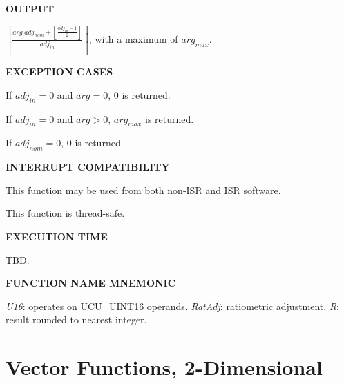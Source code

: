 \noindent\textbf{OUTPUT}
\begin{list}{}{\setlength{\leftmargin}{0.25in}\setlength{\topsep}{0.0in}}
\item       $\displaystyle{\left\lfloor \frac{arg\;adj_{nom} + \left\lfloor \displaystyle{\frac{adj_{in} - 1}{2}} \right\rfloor}{adj_{in}} \right\rfloor}$,
            with a maximum of $arg_{max}$.
\end{list}
\vspace{2.8ex}

\noindent\textbf{EXCEPTION CASES}
\begin{list}{}{\setlength{\leftmargin}{0.25in}\setlength{\topsep}{0.0in}}
\item If $adj_{in}=0$ and $arg=0$, 0 is returned.
\item If $adj_{in}=0$ and $arg>0$, $arg_{max}$ is returned.
\item If $adj_{nom}=0$, 0 is returned.
\end{list}
\vspace{2.8ex}

\noindent\textbf{INTERRUPT COMPATIBILITY}
\begin{list}{}{\setlength{\leftmargin}{0.25in}\setlength{\topsep}{0.0in}}
\item This function may be used from both non-ISR and ISR software.
\item This function is thread-safe.
\end{list}
\vspace{2.8ex}

\noindent\textbf{EXECUTION TIME}
\begin{list}{}{\setlength{\leftmargin}{0.25in}\setlength{\topsep}{0.0in}}
\item TBD.
\end{list}
\vspace{2.8ex}

\noindent\textbf{FUNCTION NAME MNEMONIC}
\begin{list}{}{\setlength{\leftmargin}{0.25in}\setlength{\topsep}{0.0in}}
\item \emph{U16}: operates on UCU\_UINT16 operands.
      \emph{RatAdj}: ratiometric adjustment.
      \emph{R}:   result rounded to nearest integer.
\end{list}


\section{Vector Functions, 2-Dimensional}
\label{cafn0:svft0}


